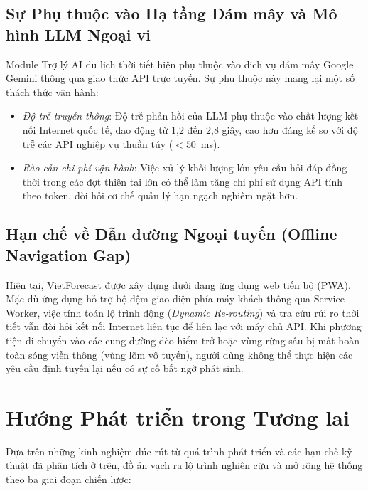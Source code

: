 \subsection{Sự Phụ thuộc vào Hạ tầng Đám mây và Mô hình LLM Ngoại vi}
Module Trợ lý AI du lịch thời tiết hiện phụ thuộc vào dịch vụ đám mây Google Gemini thông qua giao thức API trực tuyến. Sự phụ thuộc này mang lại một số thách thức vận hành:
\begin{itemize}
    \item[-] \textit{Độ trễ truyền thông}: Độ trễ phản hồi của LLM phụ thuộc vào chất lượng kết nối Internet quốc tế, dao động từ 1,2 đến 2,8 giây, cao hơn đáng kể so với độ trễ các API nghiệp vụ thuần túy ($< 50$~ms).
    \item[-] \textit{Rào cản chi phí vận hành}: Việc xử lý khối lượng lớn yêu cầu hỏi đáp đồng thời trong các đợt thiên tai lớn có thể làm tăng chi phí sử dụng API tính theo token, đòi hỏi cơ chế quản lý hạn ngạch nghiêm ngặt hơn.
\end{itemize}

\subsection{Hạn chế về Dẫn đường Ngoại tuyến (Offline Navigation Gap)}
Hiện tại, VietForecast được xây dựng dưới dạng ứng dụng web tiến bộ (PWA). Mặc dù ứng dụng hỗ trợ bộ đệm giao diện phía máy khách thông qua Service Worker, việc tính toán lộ trình động (\textit{Dynamic Re-routing}) và tra cứu rủi ro thời tiết vẫn đòi hỏi kết nối Internet liên tục để liên lạc với máy chủ API. Khi phương tiện di chuyển vào các cung đường đèo hiểm trở hoặc vùng rừng sâu bị mất hoàn toàn sóng viễn thông (vùng lõm vô tuyến), người dùng không thể thực hiện các yêu cầu định tuyến lại nếu có sự cố bất ngờ phát sinh.

\section{Hướng Phát triển trong Tương lai}
\label{sec:future_work}

Dựa trên những kinh nghiệm đúc rút từ quá trình phát triển và các hạn chế kỹ thuật đã phân tích ở trên, đồ án vạch ra lộ trình nghiên cứu và mở rộng hệ thống theo ba giai đoạn chiến lược:

